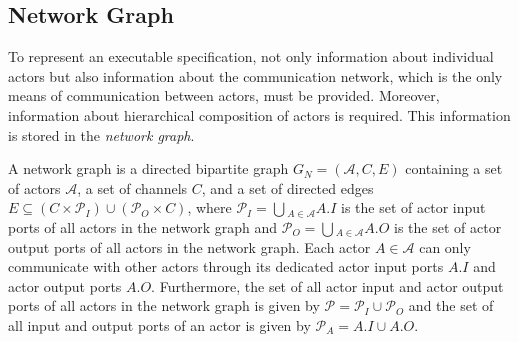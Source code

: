 \subsection{Network Graph}\label{network-graph} 

To represent an executable specification, not only information about
individual actors but also information about the communication network,
which is the only means of communication between actors,
must be provided. Moreover, information about hierarchical
composition of actors is required. This information is stored in
the \emph{network graph}.

\begin{definition}
A network graph is a directed bipartite graph $G_N=(\mathcal{A},C,E)$ containing
a set of actors $\mathcal{A}$, a set of channels $C$, and a set of
directed edges $E \subseteq (C \times \mathcal{P}_I)
\cup (\mathcal{P}_O \times C)$, where
$\mathcal{P}_I = \bigcup{}_{A \in \mathcal{A}} A.I$
is the set of actor input ports of all actors in the network graph and
$\mathcal{P}_O = \bigcup{}_{A \in \mathcal{A}} A.O$
is the set of actor output ports of all actors in the network graph.
Each actor $A \in \mathcal{A}$ can only communicate with other actors
through its dedicated actor input ports $A.I$ and
actor output ports $A.O$.
Furthermore, the set of all actor input and actor output ports of all actors in
the network graph is given by $\mathcal{P} = \mathcal{P}_I \cup \mathcal{P}_O$ and
the set of all input and output ports of an actor is given by $\mathcal{P}_{A} = A.I \cup A.O$.


\end{definition}

